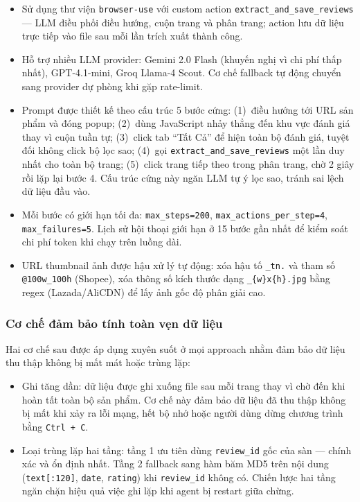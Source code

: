 \begin{itemize}[labelsep=10pt, leftmargin=2cm]
    \item Sử dụng thư viện \texttt{browser-use} với custom action \texttt{extract\_and\_save\_reviews} --- LLM điều phối điều hướng, cuộn trang và phân trang; action lưu dữ liệu trực tiếp vào file sau mỗi lần trích xuất thành công.
    \item Hỗ trợ nhiều LLM provider: Gemini 2.0 Flash (khuyến nghị vì chi phí thấp nhất), GPT-4.1-mini, Groq Llama-4 Scout. Cơ chế fallback tự động chuyển sang provider dự phòng khi gặp rate-limit.
    \item Prompt được thiết kế theo cấu trúc 5 bước cứng: (1)~điều hướng tới URL sản phẩm và đóng popup; (2)~dùng JavaScript nhảy thẳng đến khu vực đánh giá thay vì cuộn tuần tự; (3)~click tab ``Tất Cả'' để hiện toàn bộ đánh giá, tuyệt đối không click bộ lọc sao; (4)~gọi \texttt{extract\_and\_save\_reviews} một lần duy nhất cho toàn bộ trang; (5)~click trang tiếp theo trong phân trang, chờ 2 giây rồi lặp lại bước 4. Cấu trúc cứng này ngăn LLM tự ý lọc sao, tránh sai lệch dữ liệu đầu vào.
    \item Mỗi bước có giới hạn tối đa: \texttt{max\_steps=200}, \texttt{max\_actions\_per\_step=4}, \texttt{max\_failures=5}. Lịch sử hội thoại giới hạn ở 15 bước gần nhất để kiểm soát chi phí token khi chạy trên luồng dài.
    \item URL thumbnail ảnh được hậu xử lý tự động: xóa hậu tố \texttt{\_tn.} và tham số \texttt{@100w\_100h} (Shopee), xóa thông số kích thước dạng \texttt{\_\{w\}x\{h\}.jpg} bằng regex (Lazada/AliCDN) để lấy ảnh gốc độ phân giải cao.
\end{itemize}

\subsubsection{Cơ chế đảm bảo tính toàn vẹn dữ liệu}

Hai cơ chế sau được áp dụng xuyên suốt ở mọi approach nhằm đảm bảo dữ liệu thu thập không bị mất mát hoặc trùng lặp:

\begin{itemize}[labelsep=10pt, leftmargin=2cm]
    \item Ghi tăng dần: dữ liệu được ghi xuống file sau mỗi trang thay vì chờ đến khi hoàn tất toàn bộ sản phẩm. Cơ chế này đảm bảo dữ liệu đã thu thập không bị mất khi xảy ra lỗi mạng, hết bộ nhớ hoặc người dùng dừng chương trình bằng \texttt{Ctrl + C}.
    \item Loại trùng lặp hai tầng: tầng 1 ưu tiên dùng \texttt{review\_id} gốc của sàn --- chính xác và ổn định nhất. Tầng 2 fallback sang hàm băm MD5 trên nội dung (\texttt{text[:120]}, \texttt{date}, \texttt{rating}) khi \texttt{review\_id} không có. Chiến lược hai tầng ngăn chặn hiệu quả việc ghi lặp khi agent bị restart giữa chừng.
\end{itemize}

